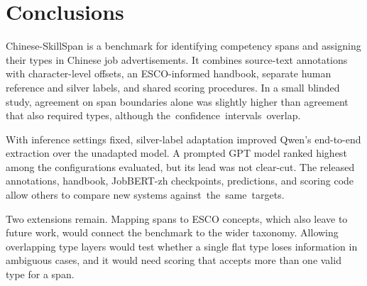 \section{Conclusions}
\label{sec:conclusion}

Chinese-SkillSpan is a benchmark for identifying competency spans and assigning their types in Chinese job advertisements. It combines source-text annotations with character-level offsets, an ESCO-informed handbook, separate human reference and silver labels, and shared scoring procedures. In a small blinded study, agreement on span boundaries alone was slightly higher than agreement that also required types, although \mbox{the confidence intervals overlap.}

With inference settings fixed, silver-label adaptation improved Qwen's end-to-end extraction over the unadapted model. A prompted GPT model ranked highest among the configurations evaluated, but its lead was not clear-cut. The released annotations, handbook, JobBERT-zh checkpoints, predictions, and scoring code allow others to compare new systems \mbox{against the same targets.}

Two extensions remain. Mapping spans to ESCO concepts, which \citet{zhang2022skillspan} also leave to future work, would connect the benchmark to the wider taxonomy. Allowing overlapping type layers would test whether a single flat type loses information in ambiguous cases, and it would need scoring that accepts more than one valid type for a span.

